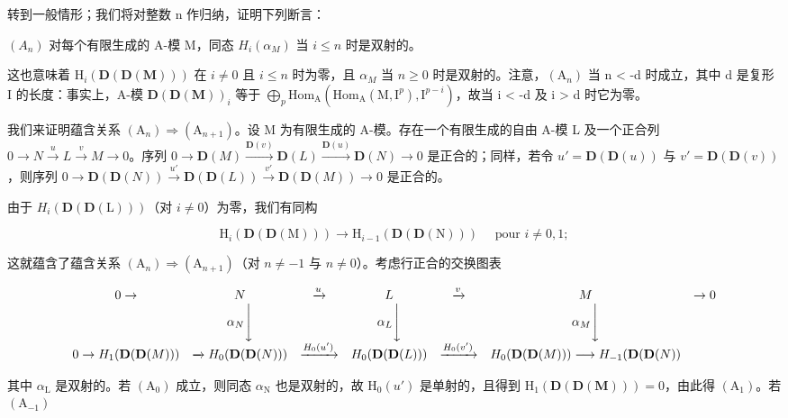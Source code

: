 转到一般情形；我们将对整数 n 作归纳，证明下列断言：

\((A_{n})\) 对每个有限生成的 A-模 M，同态 \(H_{i}(\alpha_{M})\) 当 \(i \leqslant n\) 时是双射的。

这也意味着 \(\mathrm{H}_{i}(\mathbf{D}(\mathbf{D}(\mathbf{M})))\) 在 \(i \neq 0\) 且 \(i \leqslant n\) 时为零，且 \(\alpha_{M}\) 当 \(n \geqslant 0\) 时是双射的。注意，\((\mathrm{A}_{n})\) 当 n \textless{} -d 时成立，其中 d 是复形 I 的长度：事实上，A-模 \(\mathbf{D}(\mathbf{D}(\mathbf{M}))_{i}\) 等于 \(\bigoplus_{p}\mathrm{Hom}_{\mathrm{A}}(\mathrm{Hom}_{\mathrm{A}}(\mathrm{M},\mathrm{I}^{p}),\mathrm{I}^{p-i})\)，故当 i \textless{} -d 及 i \textgreater{} d 时它为零。

我们来证明蕴含关系 \((\mathrm{A}_{n}) \Rightarrow (\mathrm{A}_{n+1})\)。设 M 为有限生成的 A-模。存在一个有限生成的自由 A-模 L 及一个正合列 \(0 \to N \xrightarrow{u} L \xrightarrow{v} M \to 0\)。序列 \(0 \to \mathbf{D}(M) \xrightarrow{\mathbf{D}(v)} \mathbf{D}(L) \xrightarrow{\mathbf{D}(u)} \mathbf{D}(N) \to 0\) 是正合的；同样，若令 \(u' = \mathbf{D}(\mathbf{D}(u))\) 与 \(v' = \mathbf{D}(\mathbf{D}(v))\)，则序列 \(0 \to \mathbf{D}(\mathbf{D}(N)) \xrightarrow{u'} \mathbf{D}(\mathbf{D}(L)) \xrightarrow{v'} \mathbf{D}(\mathbf{D}(M)) \to 0\) 是正合的。

由于 \(H_{i}(\mathbf{D}(\mathbf{D}(\mathrm{L})))\)（对 \(i \neq 0\)）为零，我们有同构

\[
\mathrm{H} _ {i} (\mathbf {D} (\mathbf {D} (\mathrm{M}))) \longrightarrow \mathrm{H} _ {i - 1} (\mathbf {D} (\mathbf {D} (\mathrm{N}))) \quad \text { pour } i \neq 0, 1;
\]

这就蕴含了蕴含关系 \((\mathrm{A}_{n})\Rightarrow(\mathrm{A}_{n+1})\)（对 \(n\neq-1\) 与 \(n\neq0\)）。考虑行正合的交换图表

\[
\begin{array}{c c c c c c c} 0 \to & N & \xrightarrow {u} & L & \xrightarrow {v} & M & \to 0 \\ & \alpha_ {N} \Bigg \downarrow & & \alpha_ {L} \Bigg \downarrow & & \alpha_ {M} \Bigg \downarrow \\ 0 \to H _ {1} (\mathbf {D} (\mathbf {D} (M))) & \xrightarrow {} H _ {0} (\mathbf {D} (\mathbf {D} (N))) & \xrightarrow {H _ {0} (u ^ {\prime})} & H _ {0} (\mathbf {D} (\mathbf {D} (L))) & \xrightarrow {H _ {0} (v ^ {\prime})} & H _ {0} (\mathbf {D} (\mathbf {D} (M))) \longrightarrow H _ {- 1} (\mathbf {D} (\mathbf {D} (N)) \end{array}
\]

其中 \(\alpha_{\mathrm{L}}\) 是双射的。若 \((\mathrm{A}_0)\) 成立，则同态 \(\alpha_{\mathrm{N}}\) 也是双射的，故 \(\mathrm{H}_0(u')\) 是单射的，且得到 \(\mathrm{H}_1(\mathbf{D}(\mathbf{D}(\mathbf{M}))) = 0\)，由此得 \((\mathrm{A}_1)\)。若 \((\mathrm{A}_{-1})\)

